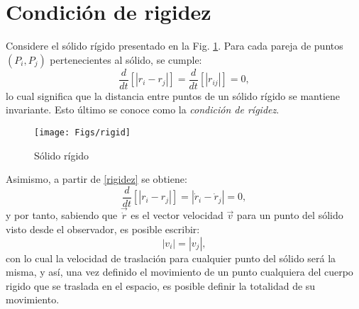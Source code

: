 \section*{Condición de rigidez}
Considere el sólido rígido presentado en la Fig. \ref{rigid}. Para cada pareja de puntos $(P_i, P_j)$ pertenecientes al sólido, se cumple:
\begin{equation}\label{rigidez}
\frac{d}{dt}[\left|r_i - r_j\right|] = \frac{d}{dt}[\left|r_{ij}\right|] = 0,
\end{equation}
lo cual significa que la distancia entre puntos de un sólido rígido se mantiene invariante. Esto último se conoce como la \emph{condición de rígidez}.\\
\begin{figure}[h]
\centering
\caption[]{Sólido rígido}\label{rigid}
\texttt{[image: Figs/rigid]}
\end{figure}

\noindent Asimismo, a partir de \eqref{rigidez} se obtiene:
\begin{equation}
\frac{d}{dt}[\left|r_i - r_j\right|] = \left|\dot{r}_i - \dot{r}_j\right| = 0,
\end{equation}
y por tanto, sabiendo que $\vec{\dot{r}}$ es el vector velocidad $\vec{v}$ para un punto del sólido visto desde el observador, es posible escribir:
\begin{equation}
\left|v_i\right| = \left|v_j\right|,
\end{equation}
con lo cual la velocidad de traslación para cualquier punto del sólido será la misma, y así, una vez definido el movimiento de un punto cualquiera del cuerpo rigido que se traslada en el espacio, es posible definir la totalidad de su movimiento.


